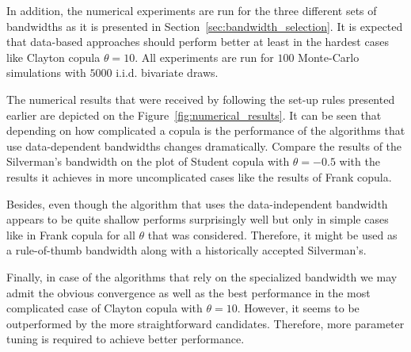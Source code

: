 \documentclass[12pt]{article}
\begin{document}
	In addition, the numerical experiments are run for the three different sets of bandwidths as it is presented in Section~\ref{sec:bandwidth_selection}. It is expected that data-based approaches should perform better at least in the hardest cases like Clayton copula $ \theta=10 $. All experiments are run for \textbf{$ 100 $} Monte-Carlo simulations with \textbf{$ 5000 $} i.i.d. bivariate draws.
	
	The numerical results that were received by following the set-up rules presented earlier are depicted on the Figure~\ref{fig:numerical_results}. It can be seen that depending on how complicated a copula is the performance of the algorithms that use data-dependent bandwidths changes dramatically. Compare the results of the Silverman's bandwidth on the plot of Student copula with $ \theta=-0.5 $ with the results it achieves in more uncomplicated cases like the results of Frank copula. 
	
	Besides, even though the algorithm that uses the data-independent bandwidth appears to be quite shallow performs surprisingly well but only in simple cases like in Frank copula for all $ \theta $ that was considered. Therefore, it might be used as a rule-of-thumb bandwidth along with a historically accepted Silverman's.
	
	Finally, in case of the algorithms that rely on the specialized bandwidth we may admit the obvious convergence as well as the best performance in the most  complicated case of Clayton copula with $ \theta=10 $. However, it seems to be outperformed by the more straightforward candidates. Therefore, more parameter tuning is required to achieve better performance.
	
\end{document}
